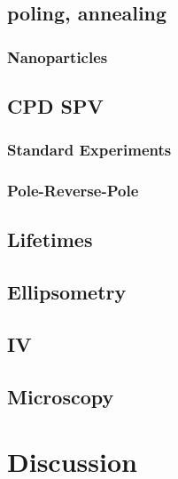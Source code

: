\subsection{\pvdf{} poling, annealing}
\subsubsection{Nanoparticles}
\subsection{CPD SPV}
\subsubsection{Standard Experiments}
\subsubsection{Pole-Reverse-Pole}
\subsection{Lifetimes}
\subsection{Ellipsometry}
\subsection{\ir{}}
\subsection{IV}
\subsection{Microscopy}
\subsection{\dls{}}


\section{Discussion}